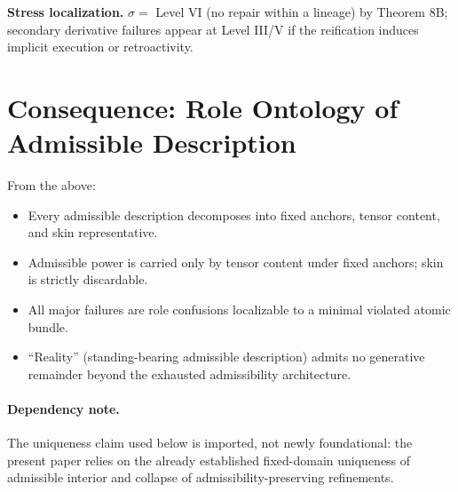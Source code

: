 \documentclass[12pt]{article}
\theoremstyle{plain}
\begin{document}
\textbf{Stress localization.} $\sigma = $ Level VI (no repair within a lineage) by Theorem 8B; secondary derivative failures appear at Level III/V if the reification induces implicit execution or retroactivity.


\section{Consequence: Role Ontology of Admissible Description}

From the above:

\begin{itemize}[leftmargin=*]
\item Every admissible description decomposes into fixed anchors, tensor content, and skin representative.
\item Admissible power is carried only by tensor content under fixed anchors; skin is strictly discardable.
\item All major failures are role confusions localizable to a minimal violated atomic bundle.
\item ``Reality'' (standing-bearing admissible description) admits no generative remainder beyond the exhausted admissibility architecture.
\end{itemize}



\paragraph{Dependency note.}
The uniqueness claim used below is imported, not newly foundational: the present paper relies on the already established fixed-domain uniqueness of admissible interior and collapse of admissibility-preserving refinements.
\end{document}

